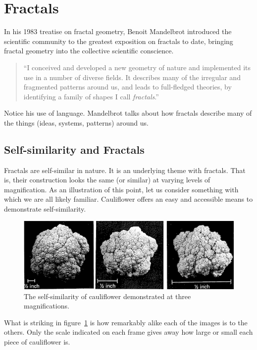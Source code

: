 \documentclass[jou,apacite]{apa6}
\begin{document}
\section{Fractals}  %
In his 1983 treatise on fractal geometry, Benoit Mandelbrot introduced the scientific community to the greatest exposition on fractals to date, bringing fractal geometry into the collective scientific conscience.
\begin{quote}
  ``I conceived and developed a new geometry of nature and implemented its use in a number of diverse fields.  It describes many of the irregular and fragmented patterns around us, and leads to full-fledged theories, by identifying a family of shapes I call \emph{fractals}.''~\cite{Mandelbrot}
\end{quote}

Notice his use of language.  Mandelbrot talks about how fractals describe many of the things (ideas, systems, patterns) around us.  

\subsection{Self-similarity and Fractals}
Fractals are self-similar in nature.  It is an underlying theme with fractals.  That is, their construction looks the same (or similar) at varying levels of magnification.  As an illustration of this point, let us consider something with which we are all likely familiar.  Cauliflower offers an easy and accessible means to demonstrate self-similarity.  

\begin{figure}[htpb]
  \centering
  \includegraphics[width=\columnwidth]{images/cauliflower.png}
  \caption{The self-similarity of cauliflower demonstrated at three magnifications.}
  \label{fig:cauliflower}
\end{figure}

What is striking in figure~\ref{fig:cauliflower} is how remarkably alike each of the images is to the others.  Only the scale indicated on each frame gives away how large or small each piece of cauliflower is.
\end{document}
